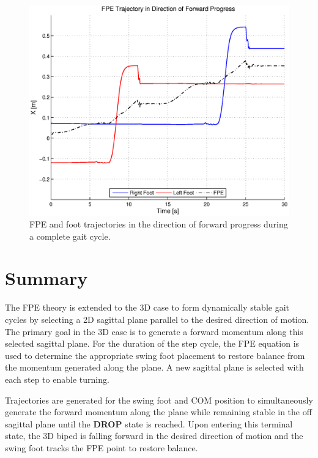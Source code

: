 \begin{figure}[!h]
	\centering
    \includegraphics[scale=0.7]{fig/simulations/fwdfpetraj.eps}
  	\caption{FPE and foot trajectories in the direction of forward progress during a complete gait cycle.}
	\label{fig:fwdfpetraj}
\end{figure}



\section{Summary} %
\label{sec:simulations_summary}
The FPE theory is extended to the 3D case to form dynamically stable gait cycles by selecting a 2D sagittal plane parallel to the desired direction of motion. The primary goal in the 3D case is to generate a forward momentum along this selected sagittal plane. For the duration of the step cycle, the FPE equation is used to determine the appropriate swing foot placement to restore balance from the momentum generated along the plane. A new sagittal plane is selected with each step to enable turning. 

Trajectories are generated for the swing foot and COM position to simultaneously generate the forward momentum along the plane while remaining stable in the off sagittal plane until the \textbf{DROP} state is reached. Upon entering this terminal state, the 3D biped is falling forward in the desired direction of motion and the swing foot tracks the FPE point to restore balance. 

